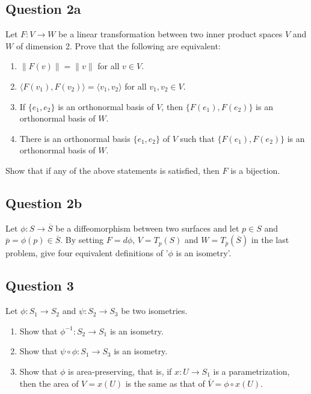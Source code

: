 \documentclass[12pt, a4paper]{article}
\newcommand{\inner}[1]{\langle #1 \rangle}
\begin{document}
\subsection*{Question 2a}
Let $F:V\rightarrow W$ be a linear transformation between two inner product spaces $V$ and $W$ of dimension 2. Prove that the following are equivalent:
\begin{enumerate}[label=(\roman*)]
    \item $\|F(v)\|=\|v\|$ for all $v\in V$.
    \item $\inner{F(v_{1}),F(v_{2})}=\inner{v_{1},v_{2}}$ for all $v_{1},v_{2}\in V$.
    \item If $\{e_{1},e_{2}\}$ is an orthonormal basis of $V$, then $\{F(e_1), F(e_2)\}$ is an orthonormal basis of $W$.
    \item There is an orthonormal basis $\{e_{1},e_{2}\}$ of $V$ such that $\{F(e_1), F(e_2)\}$ is an orthonormal basis of $W$.
\end{enumerate}
Show that if any of the above statements is satisfied, then $F$ is a bijection.
\newpage

\subsection*{Question 2b}
Let $\phi:S\rightarrow\overline{S}$ be a diffeomorphism between two surfaces and let $p\in S$ and $\overline{p}=\phi(p)\in\overline{S}$. By setting $F=d\phi$, $V=T_{p}(S)$ and $W=T_{\overline{p}}(\overline{S})$ in the last problem, give four equivalent definitions of '$\phi$ is an isometry'.
\newpage

\subsection*{Question 3}
Let $\phi:S_{1}\rightarrow S_{2}$ and $\psi:S_{2}\rightarrow S_{3}$ be two isometries.
\begin{enumerate}[label=(\roman*)]
    \item Show that $\phi^{-1}:S_{2}\rightarrow S_{1}$ is an isometry.
    \item Show that $\psi\circ\phi:S_{1}\rightarrow S_{3}$ is an isometry.
    \item Show that $\phi$ is area-preserving, that is, if $x: U\rightarrow S_{1}$ is a parametrization, then the area of $V=x(U)$ is the same as that of $\overline{V}=\phi\circ x(U)$.
\end{enumerate}
\newpage
\end{document}
